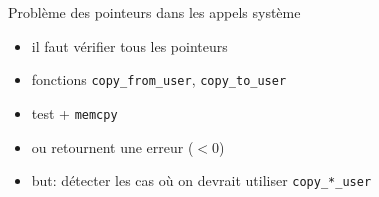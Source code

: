 
\begin{frame}{Problème des pointeurs dans les appels système}
\begin{itemize}
    \item il faut vérifier tous les pointeurs
    \item fonctions \texttt{copy\_from\_user}, \texttt{copy\_to\_user}
    \item test + \texttt{memcpy}
    \item ou retournent une erreur ($< 0$)
    \item but: détecter les cas où on devrait utiliser \texttt{copy\_*\_user}
\end{itemize}
\end{frame}

